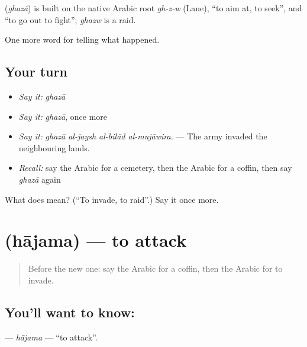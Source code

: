 \begin{cousinweb}
\textbf{} (\emph{ghazā}) is built on the native Arabic root \emph{gh-z-w} (Lane), \textquotedblleft{}to aim at, to seek\textquotedblright{}, and \textquotedblleft{}to go out to fight\textquotedblright{}; \emph{ghazw} is a raid.
\end{cousinweb}

\begin{grammarlens}[title={What you've built}]
One more word for telling what happened.
\end{grammarlens}

\subsection*{Your turn}
\begin{itemize}
\raggedright
  \item \emph{Say it:} \emph{ghazā}
  \item \emph{Say it:} \emph{ghazā}, once more
  \item \emph{Say it:} \emph{ghazā al-jaysh al-bilād al-mujāwira.} — The army invaded the neighbouring lands.
  \item \emph{Recall:} say the Arabic for a cemetery, then the Arabic for a coffin, then say \emph{ghazā} again
\end{itemize}

\begin{tcolorbox}[breakable,colback=teal!4,colframe=teal!35!black,title={Before you move on}]
What does  mean? (\textquotedblleft{}To invade, to raid\textquotedblright{}.) Say it once more.
\end{tcolorbox}
\section[\texorpdfstring{\ar{هاجم} (hājama)}{هاجم (hājama)}]{ (hājama) — to attack}

\label{lesson:AR-C339-hajama}



\begin{quote}
Before the new one: say the Arabic for a coffin, then the Arabic for to invade.
\end{quote}

\subsection*{You'll want to know: }
\textbf{} — \emph{hājama} — \textquotedblleft{}to attack\textquotedblright{}.

